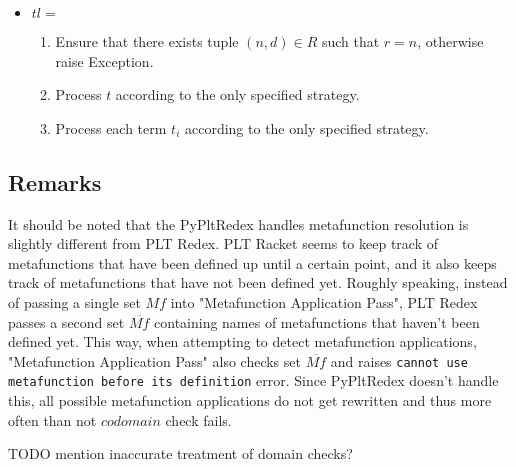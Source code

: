 \begin{itemize}
\item $tl=$ \ApplyReductionRelationAssertEqual
	\begin{enumerate}
	\item Ensure that there exists tuple $(n, d) \in R$ such that $r=n$, otherwise raise Exception.
	\item Process $t$ according to the only specified strategy.
	\item Process each term $t_i$ according to the only specified strategy.
	\end{enumerate}
\end{itemize}

\subsection{Remarks}
It should be noted that the PyPltRedex handles metafunction resolution is slightly different from PLT Redex. PLT Racket seems to keep track of metafunctions that have been defined up until a certain point, and it also keeps track of metafunctions that have not been defined yet. Roughly speaking, instead of passing a single set $Mf$ into "Metafunction Application Pass", PLT Redex passes a second set $\overline{Mf}$ containing names of metafunctions that haven't been defined yet. This way, when attempting to detect metafunction applications, "Metafunction Application Pass" also checks set $\overline{Mf}$ and raises \lstinline{cannot use metafunction before its definition} error. Since PyPltRedex doesn't handle this, all possible metafunction applications do not get rewritten and thus more often than not $codomain$ check fails.

TODO mention inaccurate treatment of domain checks?

